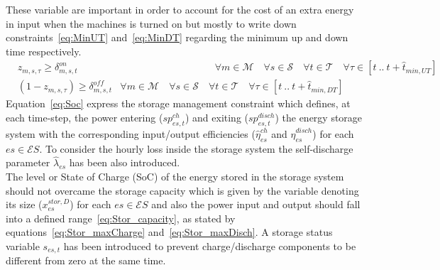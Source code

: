 \documentclass{article}
\newcommand{\cT}{{\mathcal T}}
\newcommand{\cM}{{\mathcal M}}
\newcommand{\cS}{{\mathcal S}}
\newcommand{\cES}{{\mathcal ES}}
\begin{document}
{\begin{comment}
		& \Delta_{m,s,t}^{on} \leq z_{m,s,t} & \hspace{5cm} \forall m \in \cM \quad \forall s \in \cS \quad \forall t \in \cT \label{eq:DeltaOn_3}\\
		& \Delta_{m,s,t}^{off} \geq (z_{m,s,t-1} - z_{m,s,t}) & \hspace{5cm} \forall m \in \cM \quad \forall s \in \cS \quad \forall t \setminus\{1\} \in \cT \label{eq:DeltaOff_1}\\
		& \Delta_{m,s,t}^{off} \leq (1 - z_{m,s,t}) & \hspace{5cm} \forall m \in \cM \quad \forall s \in \cS \quad \forall t \in \cT \label{eq:DeltaOff_2}\\
		& \Delta_{m,s,t}^{off} \leq z_{m,s,t-1} & \hspace{5cm} \forall m \in \cM \quad \forall s \in \cS \quad \forall t \setminus\{1\} \in \cT \label{eq:DeltaOff_3}
		\end{align}
\end{comment}
These variable are important in order to account for the cost of an extra energy in input when the machines is turned on but mostly to write down constraints~\eqref{eq:MinUT} and~\eqref{eq:MinDT} regarding the minimum up and down time respectively.	
		\begin{align}
		& z_{m,s,\tau} \geq \delta_{m,s,t}^{on} & \hspace{4cm} \forall m \in \cM \quad \forall s \in \cS \quad \forall t  \in \cT \quad \forall \tau \in [t\ .. \ t + \hat{t}_{min,UT}] \label{eq:MinUT}\\
		& (1 - z_{m,s,\tau}) \geq \delta_{m,s,t}^{off} & \forall m \in \cM \quad \forall s \in \cS \quad \forall t \in \cT \quad \forall \tau \in [t\ .. \ t + \hat{t}_{min,DT}] \label{eq:MinDT}
		\end{align}
Equation~\eqref{eq:Soc} express the storage management constraint which defines, at each time-step, the power entering ($sp_{es,t}^{ch}$) and exiting ($sp_{es,t}^{disch}$) the energy storage system with the corresponding input/output efficiencies ($\hat{\eta}_{es}^{ch}$ and $\hat{\eta}_{es}^{disch}$) for each $es \in \cES$. To consider the hourly loss inside the storage system the self-discharge parameter $\hat{\lambda}_{es}$ has been also introduced. \\
The level or State of Charge (SoC) of the energy stored in the storage system should not overcame the storage capacity which is given by the variable denoting its size ($x_{es}^{stor, D}$) for each $es \in \cES$ and also the power input and output should fall into a defined range~\eqref{eq:Stor_capacity}, as stated by equations~\eqref{eq:Stor_maxCharge} and~\eqref{eq:Stor_maxDisch}. A storage status variable $s_{es,t}$ has been introduced to prevent charge/discharge components to be different from zero at the same time. \\
}
\end{document}
